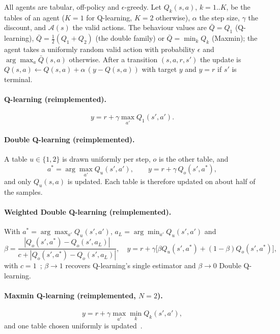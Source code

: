 All agents are tabular, off-policy and $\epsilon$-greedy. Let $Q_k(s,a)$, $k=1..K$, be the tables of an agent ($K=1$ for Q-learning, $K=2$ otherwise), $\alpha$ the step size, $\gamma$ the discount, and $\mathcal A(s)$ the valid actions. The behaviour values are $\bar Q=Q_1$ (Q-learning), $\bar Q=\tfrac12(Q_1+Q_2)$ (the double family) or $\bar Q=\min_k Q_k$ (Maxmin); the agent takes a uniformly random valid action with probability $\epsilon$ and $\arg\max_a \bar Q(s,a)$ otherwise. After a transition $(s,a,r,s')$ the update is $Q(s,a)\leftarrow Q(s,a)+\alpha\,(y-Q(s,a))$ with target $y$ and $y=r$ if $s'$ is terminal.

\paragraph{Q-learning (reimplemented).}
\begin{equation}
y = r+\gamma \max_{a'} Q_1(s',a').
\end{equation}

\paragraph{Double Q-learning (reimplemented).} A table $u\in\{1,2\}$ is drawn uniformly per step, $o$ is the other table, and
\begin{equation}
a^\ast=\arg\max_{a'}Q_u(s',a'),\qquad y=r+\gamma\,Q_o(s',a^\ast),\label{eq:dq}
\end{equation}
and only $Q_u(s,a)$ is updated. Each table is therefore updated on about half of the samples.

\paragraph{Weighted Double Q-learning (reimplemented).} With $a^\ast=\arg\max_{a'}Q_u(s',a')$, $a_L=\arg\min_{a'}Q_u(s',a')$ and
\begin{equation}
\beta=\frac{|Q_o(s',a^\ast)-Q_o(s',a_L)|}{c+|Q_o(s',a^\ast)-Q_o(s',a_L)|},\quad y=r+\gamma\big[\beta Q_u(s',a^\ast)+(1-\beta)Q_o(s',a^\ast)\big],
\end{equation}
with $c=1$~\cite{zhang2017weighted}; $\beta\to1$ recovers Q-learning's single estimator and $\beta\to0$ Double Q-learning.

\paragraph{Maxmin Q-learning (reimplemented, $N=2$).}
\begin{equation}
y=r+\gamma\max_{a'}\min_{k} Q_k(s',a'),
\end{equation}
and one table chosen uniformly is updated~\cite{lan2020maxmin}.

